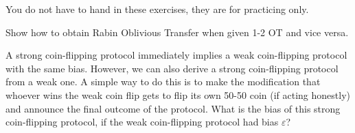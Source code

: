 \documentclass[a4paper,10pt,landscape,twocolumn]{scrartcl}
\begin{document}
\newcommand{\Hi}{\mathcal{H}}

\practiceproblems

{\sffamily\noindent
You do not have to hand in these exercises, they are for practicing only. %
}

\begin{exercise}[Rabin OT vs 1-2 OT]
Show how to obtain Rabin Oblivious Transfer when given 1-2 OT and vice versa.
\end{exercise}

\begin{exercise}
A strong coin-flipping protocol immediately implies a weak coin-flipping protocol with the same bias. However, we can also derive a strong coin-flipping protocol from a weak one. A simple way to do this is to make the modification that whoever wins the weak coin flip gets to flip its own 50-50 coin (if acting honestly) and announce the final outcome of the protocol. What is the bias of this strong coin-flipping protocol, if the weak coin-flipping protocol had bias $\varepsilon$?
\end{exercise}
\end{document}

